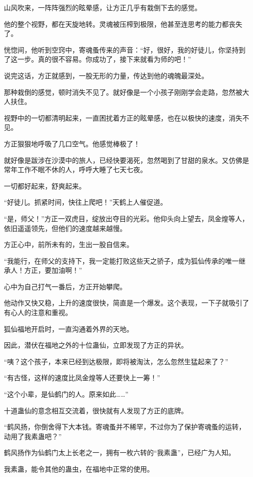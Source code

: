 \begin{this_body}
山风吹来，一阵阵强烈的眩晕感，让方正几乎有栽倒下去的感觉。

他的整个视野，都在天旋地转。灵魂被压榨到极限，他甚至连思考的能力都丧失了。

恍惚间，他听到空窍中，寄魂蚤传来的声音：“好，很好，我的好徒儿，你坚持到了这一步。真的很不容易。你成功了，接下来就看为师的吧！”

说完这话，方正就感到，一股无形的力量，传达到他的魂魄最深处。

那种栽倒的感觉，顿时消失不见了。就好像是一个小孩子刚刚学会走路，忽然被大人扶住。

视野中的一切都清明起来，一直困扰着方正的眩晕感，也在以极快的速度，消失不见。

方正狠狠地呼吸了几口空气。他感觉棒极了！

就好像是跋涉在沙漠中的旅人，已经快要渴死，忽然喝到了甘甜的泉水。又仿佛是常年工作不眠不休的人，呼呼大睡了七天七夜。

一切都好起来，舒爽起来。

“好徒儿。抓紧时间，快往上爬吧！”天鹤上人催促道。

“是，师父！”方正一双虎目，绽放出夺目的光彩。他仰头向上望去，凤金煌等人，依旧遥遥领先，但他们的速度越来越慢。

方正心中，前所未有的，生出一股自信来。

“我能行，在师父的支持下，我一定能打败这些天之骄子，成为狐仙传承的唯一继承人！方正，要加油啊！”

心中为自己打气一番后，方正开始攀爬。

他动作又快又稳，上升的速度很快，简直是一个爆发。这个表现，一下子就吸引了有心人的注意和重视。

狐仙福地开启时，一直沟通着外界的天地。

因此，潜伏在福地之外的十位蛊仙，立即发现了方正的异状。

“咦？这个孩子，本来已经到达极限，即将被淘汰，怎么忽然生猛起来了？”

“有古怪，这样的速度比凤金煌等人还要快上一筹！”

“这个小辈，是仙鹤门的人。原来如此……”

十道蛊仙的意念相互交流着，很快就有人发现了方正的底牌。

“鹤风扬，你倒舍得下大本钱。寄魂蚤并不稀罕，不过你为了保护寄魂蚤的运转，动用了我素蛊吧？”

鹤风扬作为仙鹤门太上长老之一，拥有一枚六转的“我素蛊”，已经广为人知。

我素蛊，能令其他的蛊虫，在福地中正常的使用。


\end{this_body}
